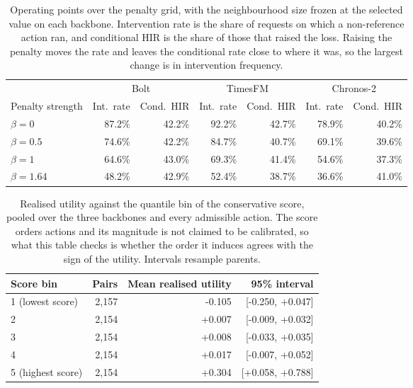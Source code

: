\documentclass{article}
\begin{document}
\begin{table}[htbp]
  \caption{Operating points over the penalty grid, with the neighbourhood size frozen at the
  selected value on each backbone. Intervention rate is the share of requests on which a
  non-reference action ran, and conditional HIR is the share of those that raised the loss.
  Raising the penalty moves the rate and leaves the conditional rate close to where it was, so
  the largest change is in intervention frequency.}
  \label{tab:app-operating}
  \centering
  \small
  \setlength{\tabcolsep}{4pt}
\begin{tabular*}{\textwidth}{@{\extracolsep{\fill}}lrrrrrr@{}}
    \toprule
     & \multicolumn{2}{c}{Bolt} & \multicolumn{2}{c}{TimesFM} & \multicolumn{2}{c}{Chronos-2} \\
    \cmidrule(lr){2-3}\cmidrule(lr){4-5}\cmidrule(lr){6-7}
    Penalty strength & Int.\ rate & Cond.\ HIR & Int.\ rate & Cond.\ HIR & Int.\ rate & Cond.\ HIR \\
    \midrule
    $\beta = 0$ & 87.2\% & 42.2\% & 92.2\% & 42.7\% & 78.9\% & 40.2\% \\
    $\beta = 0.5$ & 74.6\% & 42.2\% & 84.7\% & 40.7\% & 69.1\% & 39.6\% \\
    $\beta = 1$ & 64.6\% & 43.0\% & 69.3\% & 41.4\% & 54.6\% & 37.3\% \\
    $\beta = 1.64$ & 48.2\% & 42.9\% & 52.4\% & 38.7\% & 36.6\% & 41.0\% \\
    \bottomrule
  \end{tabular*}
\end{table}

\begin{table}[htbp]
  \caption{Realised utility against the quantile bin of the conservative score, pooled over the
  three backbones and every admissible action. The score orders actions and its magnitude is
  not claimed to be calibrated, so what this table checks is whether the order it induces
  agrees with the sign of the utility. Intervals resample parents.}
  \label{tab:app-scorebins}
  \centering
  \small
  \setlength{\tabcolsep}{4pt}
\begin{tabular*}{\textwidth}{@{\extracolsep{\fill}}lrrr@{}}
    \toprule
    Score bin & Pairs & Mean realised utility & 95\% interval \\
    \midrule
    1 (lowest score) & 2,157 & -0.105 & [-0.250, +0.047] \\
    2 & 2,154 & +0.007 & [-0.009, +0.032] \\
    3 & 2,154 & +0.008 & [-0.033, +0.035] \\
    4 & 2,154 & +0.017 & [-0.007, +0.052] \\
    5 (highest score) & 2,154 & +0.304 & [+0.058, +0.788] \\
    \bottomrule
  \end{tabular*}
\end{table}
\end{document}
